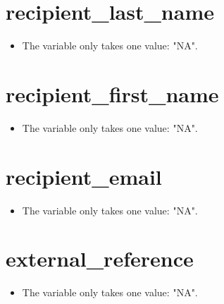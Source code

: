 \documentclass[
]{report}
\providecommand{\tightlist}{%
  \setlength{\itemsep}{0pt}\setlength{\parskip}{0pt}}
\begin{document}
\noindent\makebox[\linewidth]{\rule{\textwidth}{0.4pt}}

\hypertarget{recipient_last_name}{%
\section{recipient\_last\_name}\label{recipient_last_name}}

\begin{itemize}
\tightlist
\item
  The variable only takes one value: "NA".
\end{itemize}

\noindent\makebox[\linewidth]{\rule{\textwidth}{0.4pt}}

\hypertarget{recipient_first_name}{%
\section{recipient\_first\_name}\label{recipient_first_name}}

\begin{itemize}
\tightlist
\item
  The variable only takes one value: "NA".
\end{itemize}

\noindent\makebox[\linewidth]{\rule{\textwidth}{0.4pt}}

\hypertarget{recipient_email}{%
\section{recipient\_email}\label{recipient_email}}

\begin{itemize}
\tightlist
\item
  The variable only takes one value: "NA".
\end{itemize}

\noindent\makebox[\linewidth]{\rule{\textwidth}{0.4pt}}

\hypertarget{external_reference}{%
\section{external\_reference}\label{external_reference}}

\begin{itemize}
\tightlist
\item
  The variable only takes one value: "NA".
\end{itemize}

\noindent\makebox[\linewidth]{\rule{\textwidth}{0.4pt}}
\end{document}
